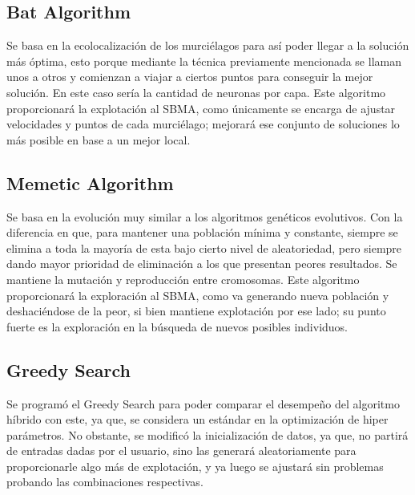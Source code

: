 \subsection{Bat Algorithm}
Se basa en la ecolocalización de los murciélagos para así poder llegar a la solución más óptima, esto porque mediante la técnica previamente mencionada se llaman unos a otros y comienzan a viajar a ciertos puntos para conseguir la mejor solución. En este caso sería la cantidad de neuronas por capa. Este algoritmo proporcionará la explotación al SBMA, como únicamente se encarga de ajustar velocidades y puntos de cada murciélago; mejorará ese conjunto de soluciones lo más posible en base a un mejor local.

\subsection{Memetic Algorithm}

Se basa en la evolución muy similar a los algoritmos genéticos evolutivos. Con la diferencia en que, para mantener una población mínima y constante, siempre se elimina a toda la mayoría de esta bajo cierto nivel de aleatoriedad, pero siempre dando mayor prioridad de eliminación a los que presentan peores resultados. Se mantiene la mutación y reproducción entre cromosomas. Este algoritmo proporcionará la exploración al SBMA, como va generando nueva población y deshaciéndose de la peor, si bien mantiene explotación por ese lado; su punto fuerte es la exploración en la búsqueda de nuevos posibles individuos.

\subsection{Greedy Search}
Se programó el Greedy Search para poder comparar el desempeño del algoritmo híbrido con este, ya que, se considera un estándar en la optimización de hiper parámetros.
No obstante, se modificó la inicialización de datos, ya que, no partirá de entradas dadas por el usuario, sino las generará aleatoriamente para proporcionarle algo más de explotación, y ya luego se ajustará sin problemas probando las combinaciones respectivas.


